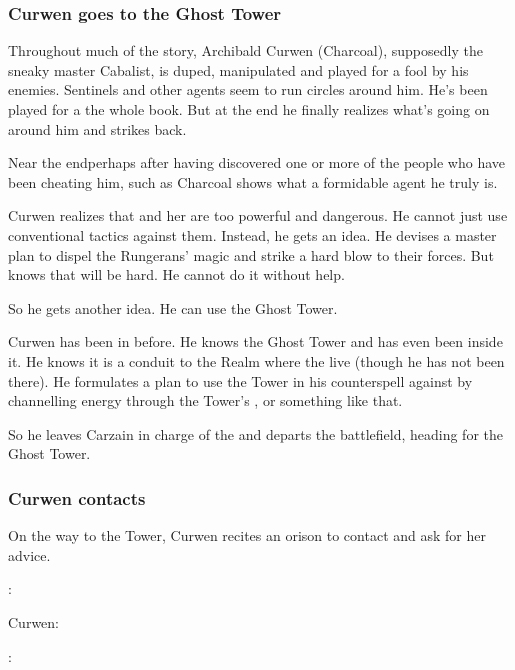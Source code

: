 \subsubsection{Curwen goes to the Ghost Tower}
Throughout much of the story, Archibald Curwen (Charcoal), supposedly the sneaky master Cabalist, is duped, manipulated and played for a fool by his enemies. Sentinels and other agents seem to run circles around him. 
He's been played for a  the whole book. 
But at the end he finally realizes what's going on around him and strikes back. 

Near the end\dash perhaps after having discovered one or more of the people who have been cheating him, such as \Sanyor{}\dash Charcoal shows what a formidable agent he truly is. 

Curwen realizes that \Takestsha and her \ishrah are too powerful and dangerous.
He cannot just use conventional tactics against them.
Instead, he gets an idea. 
He devises a master plan to dispel the Rungerans' \EreshKali magic and strike a hard blow to their forces. 
But knows that will be hard. 
He cannot do it without help. 

So he gets another idea. 
He can use the Ghost Tower.

Curwen has been in \Forclin before. 
He knows the Ghost Tower and has even been inside it. 
He knows it is a conduit to the Realm where the \resphain live (though he has not been there). 
He formulates a plan to use the Tower in his counterspell against \Takestsha by channelling energy through the Tower's \nexus, or something like that. 

So he leaves Carzain in charge of the \ishrah and departs the battlefield, heading for the Ghost Tower. 





\subsubsection{Curwen contacts \Achsah}
On the way to the Tower, Curwen recites an orison to contact \Achsah and ask for her advice. 

\begin{prose}
  \Achsah:
  
  Curwen:
  
  \Achsah:
\end{prose}

